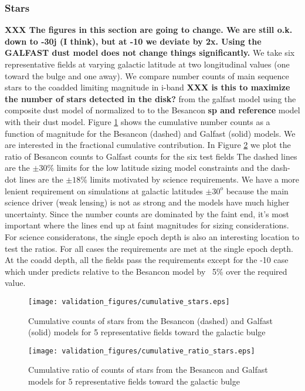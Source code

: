 \documentclass[]{article}
\begin{document}
\subsubsection{Stars}
{\bf XXX  The figures in this section are going to change.  We are still o.k. down to -30j (I think), but at -10 we deviate by 2x.  Using the GALFAST dust model
does not change things significantly.}
We take six representative fields at varying galactic latitude at two longitudinal values (one toward the bulge and one away).  We compare number 
counts of main sequence stars to the coadded limiting magnitude in i-band {\bf XXX is this to maximize the number of stars detected in the disk?}
 from the galfast model using the composite dust model
of \cite{amores} normalized to \cite{sfd} to the Besancon {\bf sp and reference} model with their dust model.  Figure \ref{fig:scounts_0} shows 
the cumulative number counts as a function of magnitude for the Besancon (dashed) and Galfast (solid) models.  We are interested in the
fractional cumulative contribution.  In Figure \ref{fig:sratio_0} we plot the ratio of Besancon counts to Galfast counts for the six test fields
The dashed lines are the $\pm30\%$ limits for the low latitude sizing model constraints and the dash-dot lines are the $\pm18\%$ limits motivated
by science requirements.  We have a more lenient requirement on simulations at galactic latitudes $\pm 30^o$ because the main science driver (weak lensing)
is not as strong and the models have much higher uncertainty.  Since the number counts are dominated by the faint end, it's most important where the lines end up at faint magnitudes for 
sizing considerations.  For science consideratons, the single epoch depth is also an interesting location to test the ratios.  For all cases the 
requirements are met at the single epoch depth.  At the coadd depth, all the fields pass the requirements except for the -10 case which under
predicts relative to the Besancon model by ~5\% over the required value.
\begin{figure}
\centering
\texttt{[image: validation\_figures/cumulative\_stars.eps]}
\caption{Cumulative counts of stars from the Besancon (dashed) and Galfast (solid) models for 5 representative fields toward the galactic bulge \label{fig:scounts_0}}
\end{figure}
\begin{figure}
\centering
\texttt{[image: validation\_figures/cumulative\_ratio\_stars.eps]}
\caption{Cumulative ratio of counts of stars from the Besancon and Galfast models for 5 representative fields toward the galactic bulge \label{fig:sratio_0}}
\end{figure}
\end{document}
